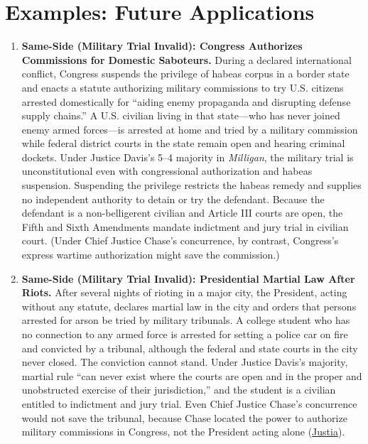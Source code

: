 \documentclass[12pt]{article}
\begin{document}
\section{Examples: Future Applications}
\begin{enumerate}

\item \textbf{Same-Side (Military Trial Invalid): Congress Authorizes Commissions for Domestic Saboteurs.} During a declared international conflict, Congress suspends the privilege of habeas corpus in a border state and enacts a statute authorizing military commissions to try U.S. citizens arrested domestically for ``aiding enemy propaganda and disrupting defense supply chains.'' A U.S. civilian living in that state---who has never joined enemy armed forces---is arrested at home and tried by a military commission while federal district courts in the state remain open and hearing criminal dockets. Under Justice Davis's 5--4 majority in \textit{Milligan}, the military trial is unconstitutional even with congressional authorization and habeas suspension. Suspending the privilege restricts the habeas remedy and supplies no independent authority to detain or try the defendant. Because the defendant is a non-belligerent civilian and Article III courts are open, the Fifth and Sixth Amendments mandate indictment and jury trial in civilian court. (Under Chief Justice Chase's concurrence, by contrast, Congress's express wartime authorization might save the commission.)

\item \textbf{Same-Side (Military Trial Invalid): Presidential Martial Law After Riots.} After several nights of rioting in a major city, the President, acting without any statute, declares martial law in the city and orders that persons arrested for arson be tried by military tribunals. A college student who has no connection to any armed force is arrested for setting a police car on fire and convicted by a tribunal, although the federal and state courts in the city never closed. The conviction cannot stand. Under Justice Davis's majority, martial rule ``can never exist where the courts are open and in the proper and unobstructed exercise of their jurisdiction,'' and the student is a civilian entitled to indictment and jury trial. Even Chief Justice Chase's concurrence would not save the tribunal, because Chase located the power to authorize military commissions in Congress, not the President acting alone (\href{https://supreme.justia.com/cases/federal/us/71/2/}{Justia}).


\end{enumerate}
\end{document}
